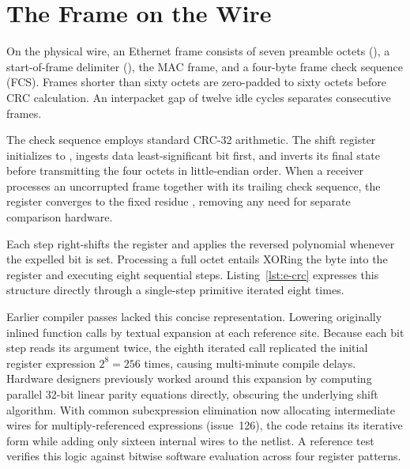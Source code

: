 \documentclass[journal,9pt]{IEEEtran}
\newcommand{\ethpart}[3]{%
}
\begin{document}
\ethpart{byte}{A byte of a frame, between the MAC and its
client.}{lst:e-byte}

\section{The Frame on the Wire}
\label{sec:e-frame}

On the physical wire, an Ethernet frame consists of seven preamble octets
(), a start-of-frame delimiter (), the MAC frame,
and a four-byte frame check sequence (FCS). Frames shorter than sixty octets
are zero-padded to sixty octets before CRC calculation. An interpacket gap
of twelve idle cycles separates consecutive frames.

The check sequence employs standard CRC-32 arithmetic. The shift register
initializes to , ingests data least-significant bit first,
and inverts its final state before transmitting the four octets in
little-endian order. When a receiver processes an uncorrupted frame together
with its trailing check sequence, the register converges to the fixed
residue , removing any need for separate comparison
hardware.

Each step right-shifts the register and applies the reversed polynomial
 whenever the expelled bit is set. Processing a full octet
entails XORing the byte into the register and executing eight sequential
steps. Listing~\ref{lst:e-crc} expresses this structure directly through a
single-step primitive iterated eight times.

Earlier compiler passes lacked this concise representation. Lowering
originally inlined function calls by textual expansion at each reference
site. Because each bit step reads its argument twice, the eighth iterated
call replicated the initial register expression $2^8 = 256$ times, causing
multi-minute compile delays. Hardware designers previously worked around
this expansion by computing parallel 32-bit linear parity equations
directly, obscuring the underlying shift algorithm. With common
subexpression elimination now allocating intermediate wires for
multiply-referenced expressions (issue~126), the code retains its iterative
form while adding only sixteen internal wires to the netlist. A reference
test verifies this logic against bitwise software evaluation across four
register patterns.

\ethpart{crc}{A byte into the CRC-32 register: one step, and eight of
them.}{lst:e-crc}
\end{document}

